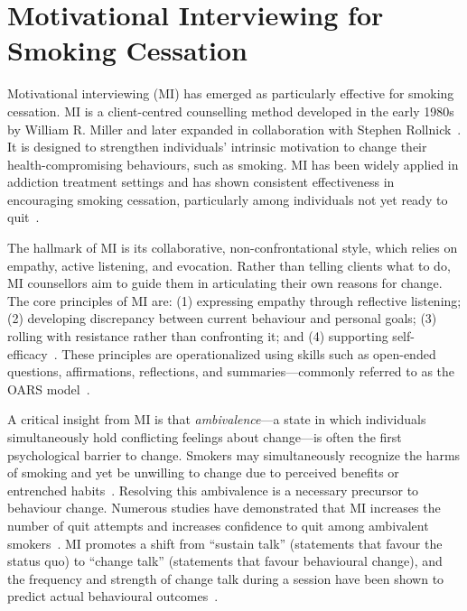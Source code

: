 \section{Motivational Interviewing for Smoking Cessation}

Motivational interviewing (MI) has emerged as particularly effective for smoking cessation. MI is a client-centred counselling method developed in the early 1980s by William R. Miller and later expanded in collaboration with Stephen Rollnick~\cite{miller1991motivational,MillerRollnick2023}. It is designed to strengthen individuals' intrinsic motivation to change their health-compromising behaviours, such as smoking. MI has been widely applied in addiction treatment settings and has shown consistent effectiveness in encouraging smoking cessation, particularly among individuals not yet ready to quit~\cite{bischof2021evidence,doi:10.1177/1049731509347850}.

The hallmark of MI is its collaborative, non-confrontational style, which relies on empathy, active listening, and evocation. Rather than telling clients what to do, MI counsellors aim to guide them in articulating their own reasons for change. The core principles of MI are: (1) expressing empathy through reflective listening; (2) developing discrepancy between current behaviour and personal goals; (3) rolling with resistance rather than confronting it; and (4) supporting self-efficacy~\cite{rollnick2008motivational}. These principles are operationalized using skills such as open-ended questions, affirmations, reflections, and summaries---commonly referred to as the OARS model~\cite{Miller_2023}.


A critical insight from MI is that \emph{ambivalence}---a state in which individuals simultaneously hold conflicting feelings about change---is often the first psychological barrier to change. Smokers may simultaneously recognize the harms of smoking and yet be unwilling to change due to perceived benefits or entrenched habits~\cite{brown2023mi}. Resolving this ambivalence is a necessary precursor to behaviour change. Numerous studies have demonstrated that MI increases the number of quit attempts and increases confidence to quit among ambivalent smokers~\cite{Abar2013, Gwaltney2009-wj}. MI promotes a shift from ``sustain talk'' (statements that favour the status quo) to ``change talk'' (statements that favour behavioural change), and the frequency and strength of change talk during a session have been shown to predict actual behavioural outcomes~\cite{Apodaca2009}.

